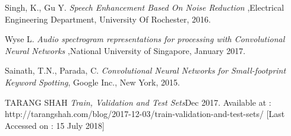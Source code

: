 \documentclass[10pt,twocolumn]{witseiepaper}
\begin{document}
\begin{thebibliography}{1}
	
	
	Singh, K., Gu Y. {\em Speech Enhancement Based On Noise Reduction} ,Electrical Engineering Department, University Of Rochester, 2016.
	

	  Wyse  L. {\em Audio spectrogram representations for processing with Convolutional Neural Networks} ,National University of Singapore, January 2017.
	
	
	
	 Sainath, T.N., Parada, C. {\em Convolutional Neural Networks for Small-footprint Keyword Spotting}, Google Inc., New York, 2015.
	
	
	
	 TARANG SHAH {\em Train, Validation and Test Sets}Dec 2017. Available at : http://tarangshah.com/blog/2017-12-03/train-validation-and-test-sets/ [Last Accessed on : 15 July 2018]
	
	
	
\end{thebibliography}

\onecolumn
\end{document}
